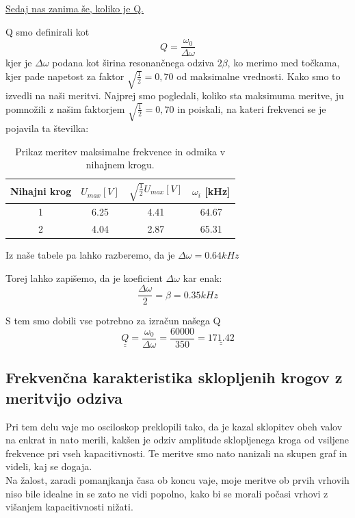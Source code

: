 \documentclass[11pt, a4paper]{article}
\theoremstyle{definition}
\theoremstyle{example}
\theoremstyle{izrek}
\begin{document}
\pagebreak
\underline{Sedaj nas zanima še, koliko je Q.} \\
\medskip

Q smo definirali kot $$Q=\frac{\omega_0}{\Delta \omega}$$
kjer je $\Delta \omega$ podana kot širina resonančnega odziva $2\beta$, ko merimo med točkama, kjer pade napetost za faktor $\sqrt{\frac{1}{2}}=0,70$ od maksimalne vrednosti.
Kako smo to izvedli na naši meritvi. Najprej smo pogledali, koliko sta maksimuma meritve, ju pomnožili z našim faktorjem $\sqrt{\frac{1}{2}}=0,70$ in poiskali, na kateri frekvenci se je pojavila ta številka:
\begin{table}[ht]
	\centering
	\begin{tabular}{|c|c|c|c|}
		\hline
		Nihajni krog & $U_{max}[V]$ & $\sqrt{\frac{1}{2}} U_{max}[V]$ & $\omega_i$ [kHz]\\
		\hline
		\hline
		1 & 6.25 & 4.41 & 64.67\\
		\hline
		2 &  4.04 & 2.87 & 65.31 \\
		\hline
		\end{tabular}
		\caption{Prikaz meritev maksimalne frekvence in odmika v nihajnem krogu.}
		\label{tab:FirstTable}
\end{table}

Iz naše tabele pa lahko razberemo, da je $\Delta \omega=0.64 kHz$

Torej lahko zapišemo, da je koeficient $\Delta \omega$ kar enak:
$$\frac{\Delta \omega}{2}= \beta =0.35 kHz$$

S tem smo dobili vse potrebno za izračun našega Q
$$\underline{\underline{Q}} =\frac{\omega_0}{\Delta \omega}=\frac{60000}{350}=\underline{\underline{171.42}} $$

\pagebreak
\subsection{Frekvenčna karakteristika sklopljenih krogov z meritvijo odziva}

Pri tem delu vaje mo osciloskop preklopili tako, da je kazal sklopitev obeh valov na enkrat in nato merili, kakšen je odziv amplitude sklopljenega kroga od vsiljene frekvence pri vseh kapacitivnosti. Te meritve smo nato nanizali na skupen graf in videli, kaj se dogaja. \\
Na žalost, zaradi pomanjkanja časa ob koncu vaje, moje meritve ob prvih vrhovih niso bile idealne in se zato ne vidi popolno, kako bi se morali počasi vrhovi z višanjem kapacitivnosti nižati. \\
\end{document}
